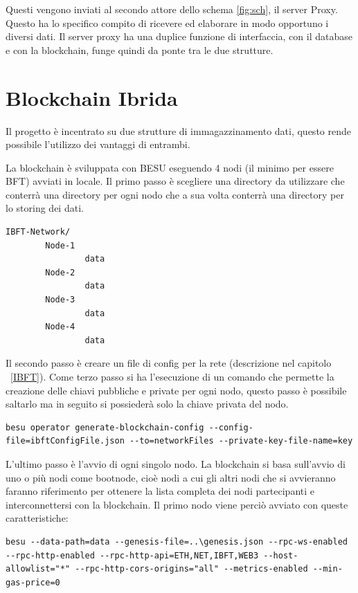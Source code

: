 \documentclass[11pt,a4paper,titlepage,twoside,openright]{report}
\begin{document}
Questi vengono inviati al secondo attore dello schema \ref{fig:sch}, il server Proxy. Questo ha lo specifico compito di ricevere ed elaborare in modo opportuno i diversi dati. Il server proxy ha una duplice funzione di interfaccia, con il database e con la blockchain, funge quindi da ponte tra le due strutture.

\section{Blockchain Ibrida}
Il progetto è incentrato su due strutture di immagazzinamento dati, questo rende possibile l'utilizzo dei vantaggi di entrambi.

La blockchain è sviluppata con BESU eseguendo 4 nodi (il minimo per essere BFT) avviati in locale.
Il primo passo è scegliere una directory da utilizzare che conterrà una directory per ogni nodo che a sua volta conterrà una directory per lo storing dei dati.
\begin{lstlisting}[language=command.com]
IBFT-Network/
		Node-1
				data
		Node-2
				data
		Node-3
				data
		Node-4
				data
\end{lstlisting}

Il secondo passo è creare un file di config per la rete (descrizione nel capitolo ~\ref{IBFT}).
Come terzo passo si ha l'esecuzione di un comando che permette la creazione delle chiavi pubbliche e private per ogni nodo, questo passo è possibile saltarlo ma in seguito si possiederà solo la chiave privata del nodo.
\begin{lstlisting}[language=command.com]
besu operator generate-blockchain-config --config-file=ibftConfigFile.json --to=networkFiles --private-key-file-name=key
\end{lstlisting}

L'ultimo passo è l'avvio di ogni singolo nodo. La blockchain si basa sull'avvio di uno o più nodi come bootnode, cioè nodi a cui gli altri nodi che si avvieranno faranno riferimento per ottenere la lista completa dei nodi partecipanti e interconnettersi con la blockchain.
Il primo nodo viene perciò avviato con queste caratteristiche:
\begin{lstlisting}[language=command.com]
besu --data-path=data --genesis-file=..\genesis.json --rpc-ws-enabled --rpc-http-enabled --rpc-http-api=ETH,NET,IBFT,WEB3 --host-allowlist="*" --rpc-http-cors-origins="all" --metrics-enabled --min-gas-price=0
\end{lstlisting}
\end{document}
